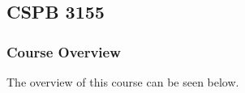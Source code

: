 \clearpage

\renewcommand{\ChapTitle}{\CSPBPPL}
\renewcommand{\SectionTitle}{CSPB 3155}

\chapter{\ChapTitle}
\section{\SectionTitle}

\subsection{Course Overview}

The overview of this course can be seen below.

